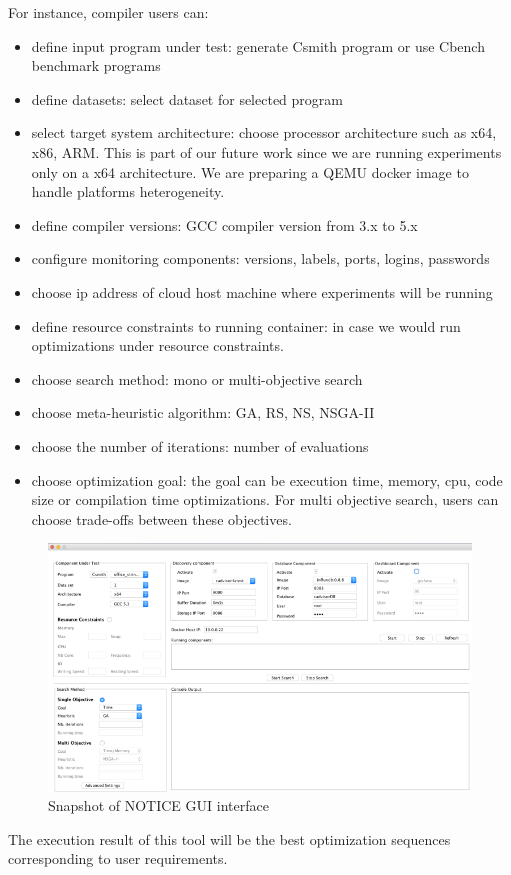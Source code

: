 For instance, compiler users can:
\begin{itemize} 
	
	
	\item define input program under test: generate Csmith program or use Cbench benchmark programs
	\item define datasets: select dataset for selected program
	\item select target system architecture: choose processor architecture such as x64, x86, ARM. This is part of our future work since we are running experiments only on a x64 architecture. We are preparing a QEMU docker image to handle platforms heterogeneity.
	\item define compiler versions: GCC compiler version from 3.x to 5.x
	\item configure monitoring components: versions, labels, ports, logins, passwords
	\item choose ip address of cloud host machine where experiments will be running
	\item define resource constraints to running container: in case we would run optimizations under resource constraints.
	\item choose search method: mono or multi-objective search
	\item choose meta-heuristic algorithm: GA, RS, NS, NSGA-II
	\item choose the number of iterations: number of evaluations
	\item choose optimization goal: the goal can be execution time, memory, cpu, code size or compilation time optimizations. For multi objective search, users can choose trade-offs between these objectives.
\end{itemize} 
\begin{figure}[h]
	\center
	\includegraphics[scale=0.65]{chapitre3/fig/tool_support}
	\caption{Snapshot of NOTICE GUI interface}
	\label{fig:tool_support}
\end{figure}
The execution result of this tool will be the best optimization sequences corresponding to user requirements.

